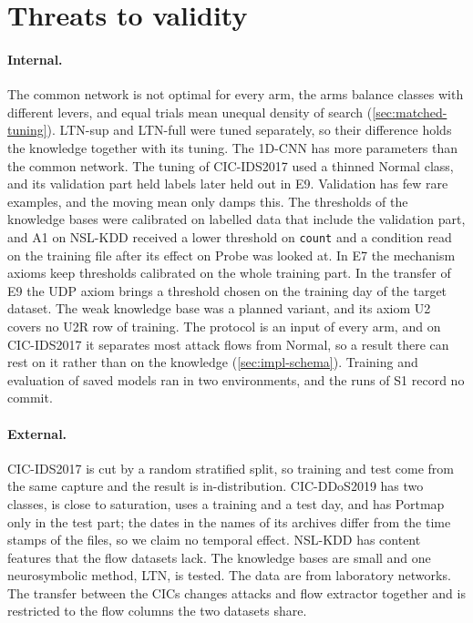 \section{Threats to validity}
\label{sec:threats}

\paragraph{Internal.}
The common network is not optimal for every arm, the arms balance classes with different
levers, and equal trials mean unequal density of search (\cref{sec:matched-tuning}). LTN-sup and LTN-full
were tuned separately, so their difference holds the knowledge together with its tuning. The 1D-CNN
has more parameters than the common network. The tuning of CIC-IDS2017 used a thinned Normal
class, and its validation part held labels later held out in E9. Validation has few rare examples,
and the moving mean only damps this. The thresholds of the knowledge bases were calibrated on
labelled data that include the validation part, and A1 on NSL-KDD received a lower threshold on
\texttt{count} and a condition read on the training file after its effect on Probe was looked at. In E7 the mechanism axioms keep thresholds calibrated on the whole
training part. In the transfer of E9 the UDP axiom brings a threshold chosen on the training day
of the target dataset. The weak knowledge base was a planned variant, and its axiom U2 covers no
U2R row of training. The protocol is an input of every arm, and on CIC-IDS2017 it separates
most attack flows from Normal, so a result there can rest on it rather than on the knowledge
(\cref{sec:impl-schema}). Training and evaluation of saved models ran in two environments, and the
runs of S1 record no commit.

\paragraph{External.}
CIC-IDS2017 is cut by a random stratified split, so training and test come from the same capture
and the result is in-distribution. CIC-DDoS2019 has two classes, is close to saturation, uses a
training and a test day, and has Portmap only in the test part; the dates in the names of its archives differ from
the time stamps of the files, so we claim no temporal effect. NSL-KDD has content features that the
flow datasets lack. The knowledge bases are small and one neurosymbolic method, LTN, is tested. The
data are from laboratory networks. The transfer between the CICs changes attacks and flow extractor
together and is restricted to the flow columns the two datasets share.

